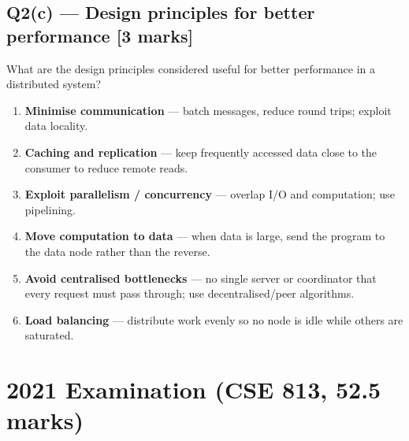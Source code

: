 \documentclass[12pt, a4paper]{article}
\newenvironment{qbox}{\begin{mdframed}[style=qframe]}{\end{mdframed}}
\newenvironment{solbox}{\begin{mdframed}[style=solframe]}{\end{mdframed}}
\newcommand{\qmarks}[1]{\hfill\textbf{\color{orange!70!black}[#1 marks]}}
\begin{document}
\subsection{Q2(c) — Design principles for better performance \texorpdfstring{\qmarks{3}}{}}
\begin{qbox}What are the design principles considered useful for better performance in a distributed system?\end{qbox}
\begin{solbox}
\begin{enumerate}[leftmargin=1.6cm, itemsep=3pt]
  \item \textbf{Minimise communication} — batch messages, reduce round trips; exploit data locality.
  \item \textbf{Caching and replication} — keep frequently accessed data close to the consumer to reduce remote reads.
  \item \textbf{Exploit parallelism / concurrency} — overlap I/O and computation; use pipelining.
  \item \textbf{Move computation to data} — when data is large, send the program to the data node rather than the reverse.
  \item \textbf{Avoid centralised bottlenecks} — no single server or coordinator that every request must pass through; use decentralised/peer algorithms.
  \item \textbf{Load balancing} — distribute work evenly so no node is idle while others are saturated.
\end{enumerate}
\end{solbox}

\section{2021 Examination (CSE 813, 52.5 marks)}
\end{document}
